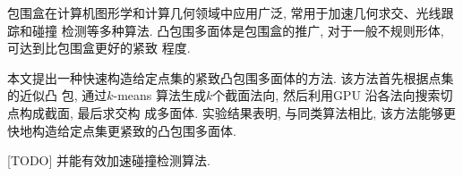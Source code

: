 
 

\makeatletter
\ifthu@bachelor\relax\else
  \ifthu@doctor
  \else
    \ifthu@master
    \fi
  \fi
\fi
\makeatother





\begin{cabstract}
  
包围盒在计算机图形学和计算几何领域中应用广泛, 常用于加速几何求交、光线跟踪和碰撞
检测等多种算法. 凸包围多面体是包围盒的推广, 对于一般不规则形体, 可达到比包围盒更好的紧致
程度. 

本文提出一种快速构造给定点集的紧致凸包围多面体的方法. 该方法首先根据点集的近似凸
包, 通过$k$-means 算法生成$k$个截面法向, 然后利用GPU 沿各法向搜索切点构成截面, 最后求交构
成多面体. 实验结果表明, 与同类算法相比,
该方法能够更快地构造给定点集更紧致的凸包围多面体. 

[TODO]
并能有效加速碰撞检测算法.


\end{cabstract}

